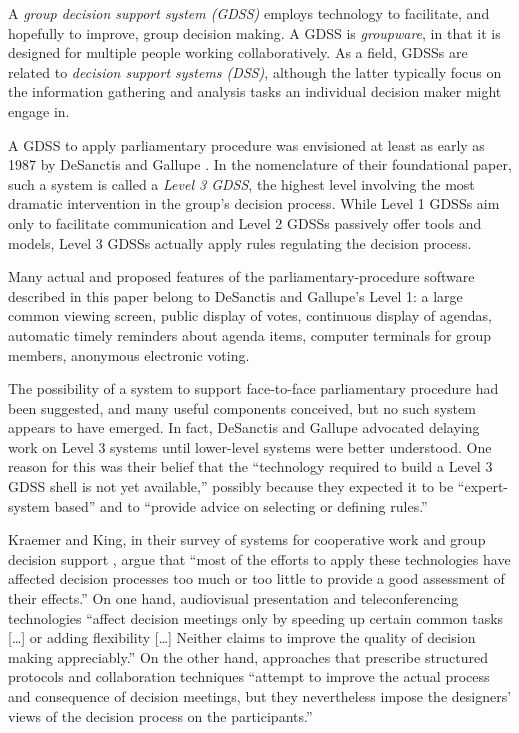 \documentclass{acm_proc_article-sp}
\begin{document}

A \emph{group decision support system (GDSS)} employs technology to facilitate, and hopefully to improve, group decision making. A GDSS is \emph{groupware}, in that it is designed for multiple people working collaboratively. As a field, GDSSs are related to \emph{decision support systems (DSS)}, although the latter typically focus on the information gathering and analysis tasks an individual decision maker might engage in.

A GDSS to apply parliamentary procedure was envisioned at least as early as 1987 by DeSanctis and Gallupe \cite{desanctis:foundation}. In the nomenclature of their foundational paper, such a system is called a \emph{Level 3 GDSS}, the highest level involving the most dramatic intervention in the group's decision process. While Level 1 GDSSs aim only to facilitate communication and Level 2 GDSSs passively offer tools and models, Level 3 GDSSs actually apply rules regulating the decision process.


Many actual and proposed features of the parliamentary-procedure software described in this paper belong to DeSanctis and Gallupe's Level 1: a large common viewing screen, public display of votes, continuous display of agendas, automatic timely reminders about agenda items, computer terminals for group members, anonymous electronic voting.

The possibility of a system to support face-to-face parliamentary procedure had been suggested, and many useful components conceived, but no such system appears to have emerged. In fact, DeSanctis and Gallupe advocated delaying work on Level 3 systems until lower-level systems were better understood. One reason for this was their belief that the ``technology required to build a Level 3 GDSS shell is not yet available,'' possibly because they expected it to be ``expert-system based'' and to ``provide advice on selecting or defining rules.''

Kraemer and King, in their survey of systems for cooperative work and group decision support \cite{kraemer:computer-based}, argue that ``most of the efforts to apply these technologies have affected decision processes too much or too little to provide a good assessment of their effects.'' On one hand, audiovisual presentation and teleconferencing technologies ``affect decision meetings only by speeding up certain common tasks [\ldots] or adding flexibility [\ldots] Neither claims to improve the quality of decision making appreciably.'' On the other hand, approaches that prescribe structured protocols and collaboration techniques ``attempt to improve the actual process and consequence of decision meetings, but they nevertheless impose the designers' views of the decision process on the participants.''
\end{document}
